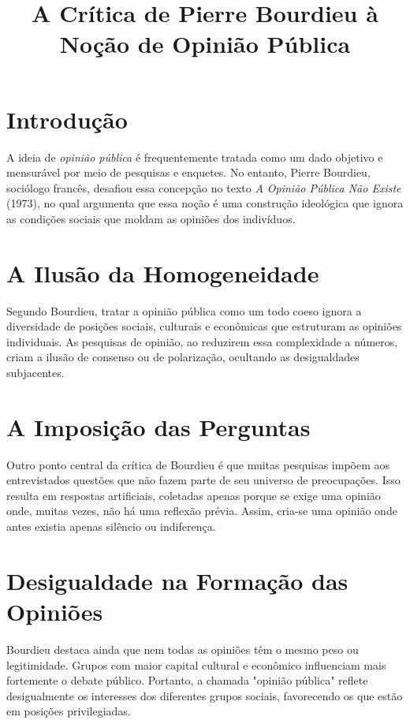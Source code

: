 \documentclass[12pt]{article}
\title{A Crítica de Pierre Bourdieu à Noção de Opinião Pública}
\author{}
\date{}
\begin{document}
\maketitle

\section*{Introdução}

A ideia de \textit{opinião pública} é frequentemente tratada como um dado objetivo e mensurável por meio de pesquisas e enquetes. No entanto, Pierre Bourdieu, sociólogo francês, desafiou essa concepção no texto \textit{A Opinião Pública Não Existe} (1973), no qual argumenta que essa noção é uma construção ideológica que ignora as condições sociais que moldam as opiniões dos indivíduos.

\section*{A Ilusão da Homogeneidade}

Segundo Bourdieu, tratar a opinião pública como um todo coeso ignora a diversidade de posições sociais, culturais e econômicas que estruturam as opiniões individuais. As pesquisas de opinião, ao reduzirem essa complexidade a números, criam a ilusão de consenso ou de polarização, ocultando as desigualdades subjacentes.

\section*{A Imposição das Perguntas}

Outro ponto central da crítica de Bourdieu é que muitas pesquisas impõem aos entrevistados questões que não fazem parte de seu universo de preocupações. Isso resulta em respostas artificiais, coletadas apenas porque se exige uma opinião onde, muitas vezes, não há uma reflexão prévia. Assim, cria-se uma opinião onde antes existia apenas silêncio ou indiferença.

\section*{Desigualdade na Formação das Opiniões}

Bourdieu destaca ainda que nem todas as opiniões têm o mesmo peso ou legitimidade. Grupos com maior capital cultural e econômico influenciam mais fortemente o debate público. Portanto, a chamada "opinião pública" reflete desigualmente os interesses dos diferentes grupos sociais, favorecendo os que estão em posições privilegiadas.
\end{document}
